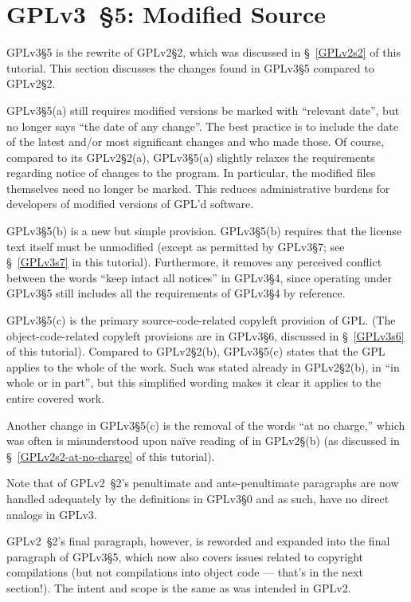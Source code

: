 \section{GPLv3~\S5: Modified Source}
\label{GPLv3s5}

GPLv3\S5 is the rewrite of GPLv2\S2, which was discussed in \S~\ref{GPLv2s2}
of this tutorial.  This section discusses the changes found in GPLv3\S5
compared to GPLv2\S2.

GPLv3\S5(a) still requires modified versions be marked with ``relevant
date'', but no longer says ``the date of any change''.  The best practice is
to include the date of the latest and/or most significant changes and who
made those.  Of course, compared to its GPLv2\S2(a), GPLv3\S5(a) slightly
relaxes the requirements regarding notice of changes to the program.  In
particular, the modified files themselves need no longer be marked.  This
reduces administrative burdens for developers of modified versions of GPL'd
software.

GPLv3\S5(b) is a new but simple provision. GPLv3\S5(b)  requires that the
license text itself must be unmodified (except as permitted by GPLv3\S7; see
\S~\ref{GPLv3s7} in this tutorial).  Furthermore, it  removes any perceived
conflict between the words ``keep intact all notices'' in GPLv3\S4, since
operating under GPLv3\S5 still includes all the requirements of GPLv3\S4 by
reference.

GPLv3\S5(c) is the primary source-code-related copyleft provision of GPL. (The
object-code-related copyleft provisions are in GPLv3\S6, discussed in
\S~\ref{GPLv3s6} of this tutorial).  Compared to GPLv2\S2(b), GPLv3\S5(c)
states that the GPL applies to the whole of the work.  Such was stated
already in GPLv2\S2(b), in ``in whole or in part'', but this simplified
wording makes it clear it applies to the entire covered work.

Another change in GPLv3\S5(c) is the removal of the
words ``at no charge,'' which was often is misunderstood upon na\"{i}ve
reading of in GPLv2\S(b) (as discussed in \S~\ref{GPLv2s2-at-no-charge} of this
tutorial).



Note that of GPLv2~\S2's penultimate and ante-penultimate paragraphs are now
handled adequately by the definitions in GPLv3\S0 and as such, have no direct
analogs in GPLv3.

GPLv2~\S2's final paragraph, however, is reworded and expanded into the final
paragraph of GPLv3\S5, which now also covers issues related to copyright
compilations (but not compilations into object code --- that's in the next
section!).  The intent and scope is the same as was intended in GPLv2.

